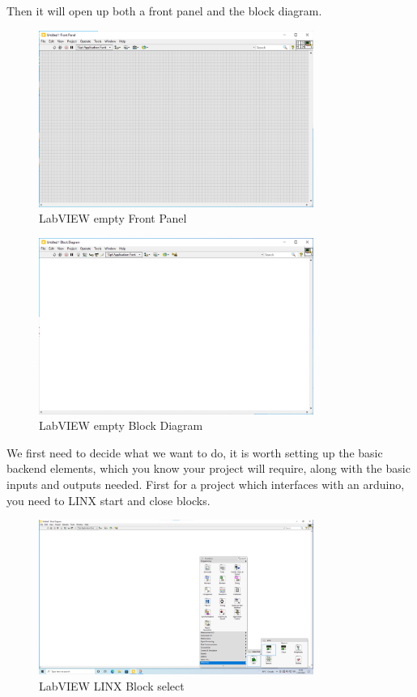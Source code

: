 \documentclass[a4paper,11pt]{report}
\begin{document}
Then it will open up both a front panel and the block diagram.

\begin{figure}[H]
\centering
\includegraphics[width=0.8\textwidth]{screenshots/labview3}
\caption{LabVIEW empty Front Panel}
\end{figure}

\begin{figure}[H]
\centering
\includegraphics[width=0.8\textwidth]{screenshots/labview4}
\caption{LabVIEW empty Block Diagram}
\end{figure}

We first need to decide what we want to do, it is worth setting up the basic backend elements, which you know your project will require, along with the basic inputs and outputs needed. First for a project which interfaces with an arduino, you need to LINX start and close blocks.

\begin{figure}[H]
\centering
\includegraphics[width=0.8\textwidth]{screenshots/labview6}
\caption{LabVIEW LINX Block select}
\end{figure}
\end{document}
